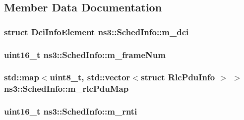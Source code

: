 \subsection{Member Data Documentation}
\subsubsection[{\texorpdfstring{m\+\_\+dci}{m_dci}}]{\setlength{\rightskip}{0pt plus 5cm}struct {\bf Dci\+Info\+Element} ns3\+::\+Sched\+Info\+::m\+\_\+dci}\hypertarget{structns3_1_1SchedInfo_aeba1cfe33a36151464d91073b503dd46}{}\label{structns3_1_1SchedInfo_aeba1cfe33a36151464d91073b503dd46}
\subsubsection[{\texorpdfstring{m\+\_\+frame\+Num}{m_frameNum}}]{\setlength{\rightskip}{0pt plus 5cm}uint16\+\_\+t ns3\+::\+Sched\+Info\+::m\+\_\+frame\+Num}\hypertarget{structns3_1_1SchedInfo_a13fe55e85049a876aaca26433fb71f32}{}\label{structns3_1_1SchedInfo_a13fe55e85049a876aaca26433fb71f32}
\subsubsection[{\texorpdfstring{m\+\_\+rlc\+Pdu\+Map}{m_rlcPduMap}}]{\setlength{\rightskip}{0pt plus 5cm}std\+::map$<$uint8\+\_\+t, std\+::vector$<$struct {\bf Rlc\+Pdu\+Info} $>$ $>$ ns3\+::\+Sched\+Info\+::m\+\_\+rlc\+Pdu\+Map}\hypertarget{structns3_1_1SchedInfo_a46d26a82bfd0ac170941471469e75ba9}{}\label{structns3_1_1SchedInfo_a46d26a82bfd0ac170941471469e75ba9}
\subsubsection[{\texorpdfstring{m\+\_\+rnti}{m_rnti}}]{\setlength{\rightskip}{0pt plus 5cm}uint16\+\_\+t ns3\+::\+Sched\+Info\+::m\+\_\+rnti}\hypertarget{structns3_1_1SchedInfo_aba1d0070256bebadb54fb391158e1f3b}{}\label{structns3_1_1SchedInfo_aba1d0070256bebadb54fb391158e1f3b}
